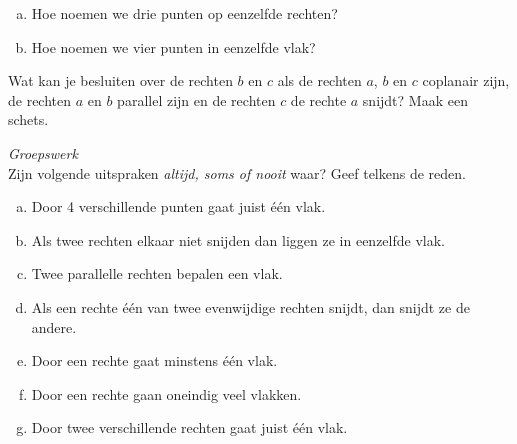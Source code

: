 \documentclass[12pt,twoside]{article}
\begin{document}
\begin{oefening}
\begin{enumerate}[(a)]
  \item Hoe noemen we drie punten op eenzelfde rechten?
  \item Hoe noemen we vier punten in eenzelfde vlak?
\end{enumerate}
\end{oefening}

\begin{oefening}
Wat kan je besluiten over de rechten $b$ en $c$ als de rechten $a$, $b$ en $c$ coplanair zijn, de rechten $a$ en $b$ parallel zijn en de rechten $c$ de rechte $a$ snijdt? Maak een schets.
\end{oefening}

\begin{oefening} {\em Groepswerk}\\
Zijn volgende uitspraken {\em altijd, soms of nooit} waar? Geef telkens de reden.
\begin{enumerate}[(a)]
  \item Door 4 verschillende punten gaat juist één vlak.
  \item Als twee rechten elkaar niet snijden dan liggen ze in eenzelfde vlak.
  \item Twee parallelle rechten bepalen een vlak.
  \item Als een rechte één van twee evenwijdige rechten snijdt, dan snijdt ze de andere.
  \item Door een rechte gaat minstens één vlak.
  \item Door een rechte gaan oneindig veel vlakken.
  \item Door twee verschillende rechten gaat juist één vlak.
\end{enumerate}
\end{oefening}
\end{document}
